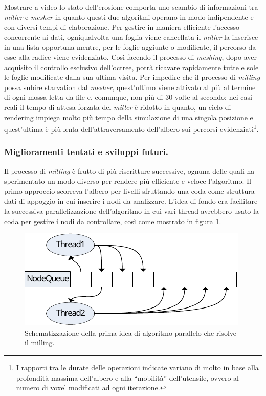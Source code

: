 Mostrare a video lo stato dell'erosione comporta uno scambio di informazioni tra \emph{miller} e \emph{mesher} in quanto questi due algoritmi operano in modo indipendente e con diversi tempi di elaborazione. Per gestire in maniera efficiente l'accesso concorrente ai dati, ogniqualvolta una foglia viene cancellata il \emph{miller} la inserisce in una lista opportuna mentre, per le foglie aggiunte o modificate, il percorso da esse alla radice viene evidenziato. Così facendo il processo di \emph{meshing}, dopo aver acquisito il controllo esclusivo dell'octree, potrà ricavare rapidamente tutte e sole le foglie modificate dalla sua ultima visita. Per impedire che il processo di \emph{milling} possa subire starvation dal \emph{mesher}, quest'ultimo viene attivato al più al termine di ogni mossa letta da file e, comunque, non più di 30 volte al secondo: nei casi reali il tempo di attesa forzata del \emph{miller} è ridotto in quanto, un ciclo di rendering impiega molto più tempo della simulazione di una singola posizione e quest'ultima è più lenta dell'attraversamento dell'albero sui percorsi evidenziati\footnote{I rapporti tra le durate delle operazioni indicate variano di molto in base alla profondità massima dell'albero e alla ``mobilità'' dell'utensile, ovvero al numero di voxel modificati ad ogni iterazione.}.

\subsubsection{Miglioramenti tentati e sviluppi futuri.}
Il processo di \emph{milling} è frutto di più riscritture successive, ognuna delle quali ha sperimentato un modo diverso per rendere più efficiente e veloce l'algoritmo. Il primo approccio scorreva l'albero per livelli sfruttando una coda come struttura dati di appoggio in cui inserire i nodi da analizzare. L'idea di fondo era facilitare la successiva parallelizzazione dell'algoritmo in cui vari thread avrebbero usato la coda per gestire i nodi da controllare, così come mostrato in figura \ref{fig:queue_parallel}.
\begin{figure}[htp]
	\centering
	\includegraphics[width=.5\textwidth]{img/queue_parallel}
	\caption{Schematizzazione della prima idea di algoritmo parallelo che risolve il milling.}
	\label{fig:queue_parallel}
\end{figure}

